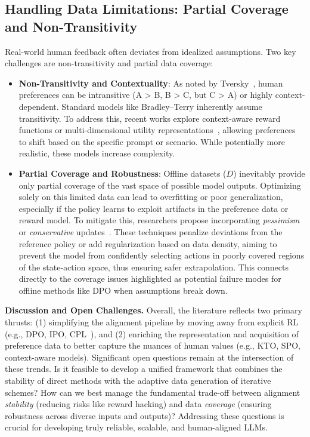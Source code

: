 \documentclass[a4paper,oneside,10pt,ngerman,english]{scrartcl}
\begin{document}
\subsection{Handling Data Limitations: Partial Coverage and Non-Transitivity}
Real-world human feedback often deviates from idealized assumptions. Two key challenges are non-transitivity and partial data coverage:
\begin{itemize}
    \item \textbf{Non-Transitivity and Contextuality}: As noted by Tversky~\cite{bib:Tversky1969}, human preferences can be intransitive (A > B, B > C, but C > A) or highly context-dependent. Standard models like Bradley--Terry inherently assume transitivity. To address this, recent works explore context-aware reward functions or multi-dimensional utility representations~\cite{bib:yang2024contextual}, allowing preferences to shift based on the specific prompt or scenario. While potentially more realistic, these models increase complexity.
    \item \textbf{Partial Coverage and Robustness}: Offline datasets (\(D\)) inevitably provide only partial coverage of the vast space of possible model outputs. Optimizing solely on this limited data can lead to overfitting or poor generalization, especially if the policy learns to exploit artifacts in the preference data or reward model. To mitigate this, researchers propose incorporating \emph{pessimism} or \emph{conservative} updates~\cite{bib:calandriello2024ipo-md}. These techniques penalize deviations from the reference policy or add regularization based on data density, aiming to prevent the model from confidently selecting actions in poorly covered regions of the state-action space, thus ensuring safer extrapolation. This connects directly to the coverage issues highlighted as potential failure modes for offline methods like DPO when assumptions break down.
\end{itemize}

\medskip
\noindent
\textbf{Discussion and Open Challenges.} Overall, the literature reflects two primary thrusts: (1) simplifying the alignment pipeline by moving away from explicit RL (e.g., DPO, IPO, CPL~\cite{bib:Zhao2023}), and (2) enriching the representation and acquisition of preference data to better capture the nuances of human values (e.g., KTO, SPO, context-aware models). Significant open questions remain at the intersection of these trends. Is it feasible to develop a unified framework that combines the stability of direct methods with the adaptive data generation of iterative schemes? How can we best manage the fundamental trade-off between alignment \emph{stability} (reducing risks like reward hacking) and data \emph{coverage} (ensuring robustness across diverse inputs and outputs)? Addressing these questions is crucial for developing truly reliable, scalable, and human-aligned LLMs.
\end{document}
